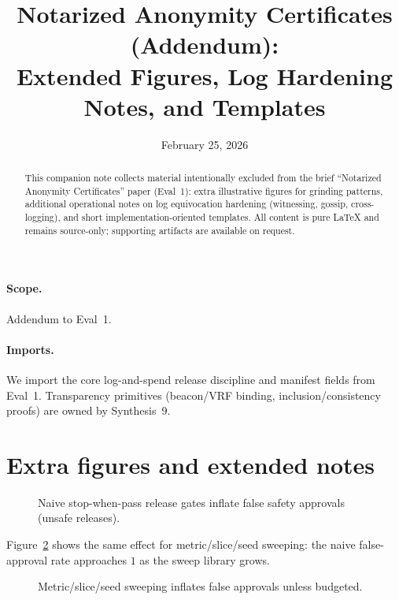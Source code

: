 \documentclass[11pt]{article}
\title{Notarized Anonymity Certificates (Addendum):\\Extended Figures, Log Hardening Notes, and Templates}
\author{}
\date{February 25, 2026}
\begin{document}
\maketitle

\begin{abstract}
This companion note collects material intentionally excluded from the brief ``Notarized Anonymity Certificates'' paper (Eval~1):
extra illustrative figures for grinding patterns, additional operational notes on log equivocation hardening (witnessing, gossip, cross-logging),
and short implementation-oriented templates. All content is pure \LaTeX{} and remains source-only; supporting artifacts are available on request.\cite{series:artifactpolicy}
\end{abstract}

\paragraph{Scope.}
Addendum to Eval~1.\cite{series:evalnotary}

\paragraph{Imports.}
We import the core log-and-spend release discipline and manifest fields from Eval~1.\cite{series:evalnotary}
Transparency primitives (beacon/VRF binding, inclusion/consistency proofs) are owned by Synthesis~9.\cite{series:transparencyprimitives}

\section{Extra figures and extended notes}

\begin{figure}[t]
\centering
{}
\caption{Naive stop-when-pass release gates inflate false safety approvals (unsafe releases).}
\label{fig:stop_when_pass}
\end{figure}

Figure~\ref{fig:sweep_grinding} shows the same effect for metric/slice/seed sweeping: the naive false-approval rate approaches $1$ as the sweep library grows.

\begin{figure}[t]
\centering
{}
\caption{Metric/slice/seed sweeping inflates false approvals unless budgeted.}
\label{fig:sweep_grinding}
\end{figure}
\end{document}
